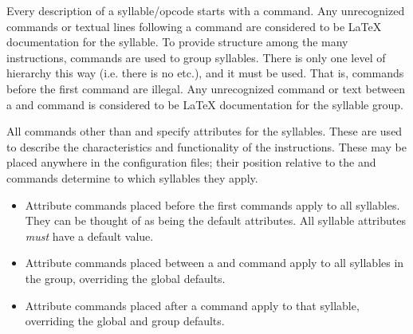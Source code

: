 Every description of a syllable/opcode starts with a \code{\syllable} command. 
Any unrecognized commands or textual lines following a \code{\syllable} command 
are considered to be LaTeX documentation for the syllable. To provide structure 
among the many instructions, \code{\section} commands are used to group 
syllables. There is only one level of hierarchy this way (i.e. there is no 
\code{\subsection} etc.), and it must be used. That is, \code{\syllable} 
commands before the first \code{\section} command are illegal. Any unrecognized 
command or text between a \code{\section} and \code{\syllable} command is 
considered to be LaTeX documentation for the syllable group.

All commands other than \code{\section} and \code{\syllable} specify attributes 
for the syllables. These are used to describe the characteristics and 
functionality of the instructions. These may be placed anywhere in the
configuration files; their position relative to the \code{\section} and
\code{\syllable} commands determine to which syllables they apply.

\begin{itemize}

\item Attribute commands placed before the first \code{\section} commands apply
      to all syllables. They can be thought of as being the default attributes.
      All syllable attributes \emph{must} have a default value.
      
\item Attribute commands placed between a \code{\section} and \code{\syllable}
      command apply to all syllables in the group, overriding the global
      defaults.

\item Attribute commands placed after a \code{\syllable} command apply to that
      syllable, overriding the global and group defaults.

\end{itemize}



